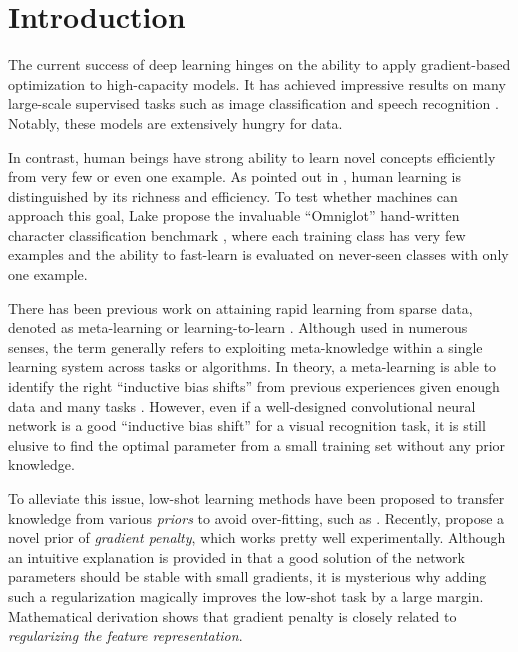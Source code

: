 \section{Introduction}
\noindent The current success of deep learning hinges on the ability to apply gradient-based optimization to high-capacity models. It has achieved impressive results on many large-scale supervised tasks such as image classification \cite{alexnet,residual_net} and speech recognition \cite{deep_asr}. %
Notably, these models are extensively hungry for data. 

In contrast, human beings have strong ability to learn novel concepts efficiently from very few or even one example. As pointed out in \cite{lake-tutorial}, human learning is distinguished by its richness and efficiency. %
To test whether machines can approach this goal, Lake \etal propose the invaluable ``Omniglot'' hand-written character classification benchmark \cite{lake-omniglot}, where each training class has very few examples and the ability to fast-learn is evaluated on never-seen classes with only one example.

There has been previous work on attaining rapid learning from sparse data, denoted as meta-learning or learning-to-learn \cite{learn-to-learn1,meta-learn-theory}.  %
Although used in numerous senses, the term generally refers to exploiting meta-knowledge within a single learning system across tasks or algorithms. In theory, a meta-learning is able to identify the right ``inductive bias shifts'' from previous experiences given enough data and many tasks \cite{meta-learn-theory}. However, even if a well-designed convolutional neural network is a good ``inductive bias shift'' for a visual recognition task, it is still elusive to find the optimal parameter from a small training set without any prior knowledge.

To alleviate this issue, low-shot learning methods have been proposed to transfer knowledge from various \textit{priors} to avoid over-fitting, such as \cite{feature-transfer}. Recently, \cite{low-shot} propose a novel prior of \textit{gradient penalty}, %
which works pretty well experimentally. Although an intuitive explanation is provided in \cite{low-shot} that a good solution of the network parameters should be stable with small gradients, it is mysterious why adding such a regularization magically improves the low-shot task by a large margin. Mathematical derivation shows that gradient penalty is closely related to \textit{regularizing the feature representation}. 

